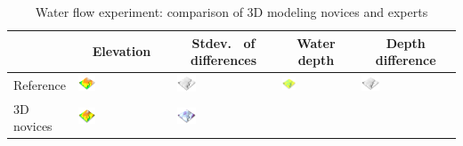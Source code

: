 \documentclass[Afour,sageh,times]{sagej}
\newcommand{\ra}[1]{\renewcommand{\arraystretch}{#1}}
\begin{document}
\begin{table}
\caption{Water flow experiment: comparison of 3D modeling novices and experts}
\ra{1.3}
\begin{tabular}{m{} m{} m{} m{} m{}}
\toprule
& \multicolumn{1}{c}{Elevation} & \multicolumn{1}{c}{Stdev.~ of differences} & \multicolumn{1}{c}{Water depth} & \multicolumn{1}{c}{Depth difference}\\
\midrule
%
Reference & 
\includegraphics[width=0.2\textwidth]{images/render_3d/3d_experts/dem_5.png} &
\includegraphics[width=0.2\textwidth]{images/render_3d/3d_experts/dem_difference_5.png}
&
\includegraphics[width=0.2\textwidth]{images/render_3d/3d_experts/depth_5.png} &
\includegraphics[width=0.2\textwidth]{images/render_3d/3d_experts/dem_difference_5.png}\\
%
3D novices & 
\includegraphics[width=0.2\textwidth]{images/render_3d/3d_novices/mean_dem_5.png} &
\includegraphics[width=0.2\textwidth]{images/render_3d/3d_novices/stdev_regression_difference_series_5.png} &

\end{tabular}
\end{table}
\end{document}
